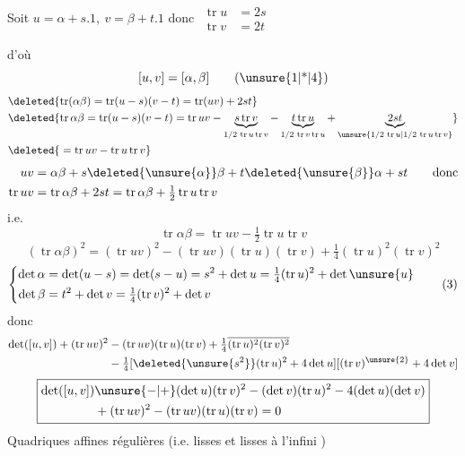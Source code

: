 Soit $u=\alpha+s.1,\ v=\beta+t.1$ donc $\begin{aligned}\operatorname{tr}u&=2s\\\operatorname{tr}v&=2t\end{aligned}$

d'où
\[
[u,v]=[\alpha,\beta]\tag*{(\unsure{1|*|4})}
\]
\[
\begin{aligned}
&\deleted{\operatorname{tr}(\alpha\beta)=\operatorname{tr}(u-s)(v-t)=\operatorname{tr}(uv)+2st}\\
&\deleted{\operatorname{tr}\alpha\beta=\operatorname{tr}(u-s)(v-t)=\operatorname{tr}uv-\underbrace{s\operatorname{tr}v}_{1/2\,\operatorname{tr}u\operatorname{tr}v}-\underbrace{t\operatorname{tr}u}_{1/2\,\operatorname{tr}v\operatorname{tr}u}+\underbrace{2st}_{\unsure{1/2\,\operatorname{tr}u|1/2\,\operatorname{tr}u\operatorname{tr}v}}}\\
&\deleted{{}=\operatorname{tr}uv-\operatorname{tr}u\operatorname{tr}v}
\end{aligned}
\]
\[
\begin{aligned}
uv&=\alpha\beta+s\deleted{\unsure{\alpha}}\beta+t\deleted{\unsure{\beta}}\alpha+st\qquad\text{donc}\\
\operatorname{tr}uv&=\operatorname{tr}\alpha\beta+2st=\operatorname{tr}\alpha\beta+\tfrac12\operatorname{tr}u\operatorname{tr}v
\end{aligned}
\]
i.e.
\[
\operatorname{tr}\alpha\beta=\operatorname{tr}uv-\tfrac12\operatorname{tr}u\operatorname{tr}v
\]
\[
(\operatorname{tr}\alpha\beta)^2=(\operatorname{tr}uv)^2-(\operatorname{tr}uv)(\operatorname{tr}u)(\operatorname{tr}v)+\tfrac14(\operatorname{tr}u)^{2}(\operatorname{tr}v)^2\tag*{(2)}
\]
\[
\left\{\begin{aligned}
\det\alpha&=\det(u-s)=\det(s-u)=s^2+\det u=\tfrac14(\operatorname{tr}u)^2+\det\unsure{u}\\
\det\beta&=t^2+\det v=\tfrac14(\operatorname{tr}v)^2+\det v
\end{aligned}\right.\tag*{(3)}
\]
donc
\[
\begin{aligned}
\det([u,v])+(\operatorname{tr}uv)^2&-(\operatorname{tr}uv)(\operatorname{tr}u)(\operatorname{tr}v)+\tfrac14\overline{(\operatorname{tr}u)^2(\operatorname{tr}v)^2}\\
&-\tfrac14[\deleted{\unsure{s^2}}(\operatorname{tr}u)^2+4\det u][(\operatorname{tr}v)^{\unsure{2}}+4\det v]
\end{aligned}
\]
\[
\boxed{\begin{aligned}
\det([u,v])&\unsure{-|+}(\det u)(\operatorname{tr}v)^2-(\det v)(\operatorname{tr}u)^2-4(\det u)(\det v)\\
&+(\operatorname{tr}uv)^2-(\operatorname{tr}uv)(\operatorname{tr}u)(\operatorname{tr}v)=0
\end{aligned}}
\]
 Quadriques affines régulières (i.e.  lisses et lisses à l'infini )

